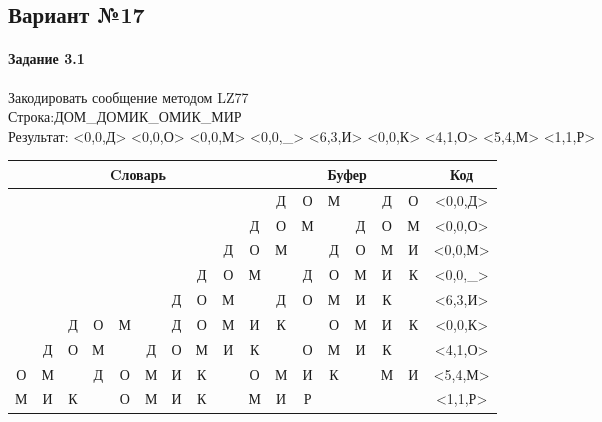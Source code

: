 \documentclass[a4paper, 12pt]{article}
\begin{document}
\pagebreak
\subsection{Вариант №17}
\paragraph{Задание 3.1}

Закодировать сообщение методом LZ77\\
Строка:ДОМ\_ДОМИК\_ОМИК\_МИР\\
Результат: <0,0,Д> <0,0,О> <0,0,М> <0,0,\_> <6,3,И> <0,0,К> <4,1,О> <5,4,М> <1,1,Р>\\
\begin{table}[h!]
\centering
\begin{tabular}{|c|c|c|c|c|c|c|c|c|c|c|c|c|c|c|c|c|} 
\hline
\multicolumn{10}{|c|}{Cловарь} & \multicolumn{6}{c|}{Буфер} & Код  \\ \hline
  &   &   &   &   &   &   &   &   &   & \cellcolor[HTML]{8CE4F6} Д & О & М &   & Д & О & <0,0,Д>
\\ \hline
  &   &   &   &   &   &   &   &   & Д & \cellcolor[HTML]{8CE4F6} О & М &   & Д & О & М & <0,0,О>
\\ \hline
  &   &   &   &   &   &   &   & Д & О & \cellcolor[HTML]{8CE4F6} М &   & Д & О & М & И & <0,0,М>
\\ \hline
  &   &   &   &   &   &   & Д & О & М & \cellcolor[HTML]{8CE4F6}   & Д & О & М & И & К & <0,0,\_>
\\ \hline
  &   &   &   &   &   & \cellcolor[HTML]{FFFF00} Д & \cellcolor[HTML]{FFFF00} О & \cellcolor[HTML]{FFFF00} М &   & \cellcolor[HTML]{FFFF00} Д & \cellcolor[HTML]{FFFF00} О & \cellcolor[HTML]{FFFF00} М & \cellcolor[HTML]{8CE4F6} И & К &   & <6,3,И>
\\ \hline
  &   & Д & О & М &   & Д & О & М & И & \cellcolor[HTML]{8CE4F6} К &   & О & М & И & К & <0,0,К>
\\ \hline
  & Д & О & М & \cellcolor[HTML]{FFFF00}   & Д & О & М & И & К & \cellcolor[HTML]{FFFF00}   & \cellcolor[HTML]{8CE4F6} О & М & И & К &   & <4,1,О>
\\ \hline
О & М &   & Д & О & \cellcolor[HTML]{FFFF00} М & \cellcolor[HTML]{FFFF00} И & \cellcolor[HTML]{FFFF00} К & \cellcolor[HTML]{FFFF00}   & О & \cellcolor[HTML]{FFFF00} М & \cellcolor[HTML]{FFFF00} И & \cellcolor[HTML]{FFFF00} К & \cellcolor[HTML]{FFFF00}   & \cellcolor[HTML]{8CE4F6} М & И & <5,4,М>
\\ \hline
М & \cellcolor[HTML]{FFFF00} И & К &   & О & М & И & К &   & М & \cellcolor[HTML]{FFFF00} И & \cellcolor[HTML]{8CE4F6} Р &   &   &   &   & <1,1,Р>
\\ \hline
\end{tabular}
\end{table}
\end{document}
